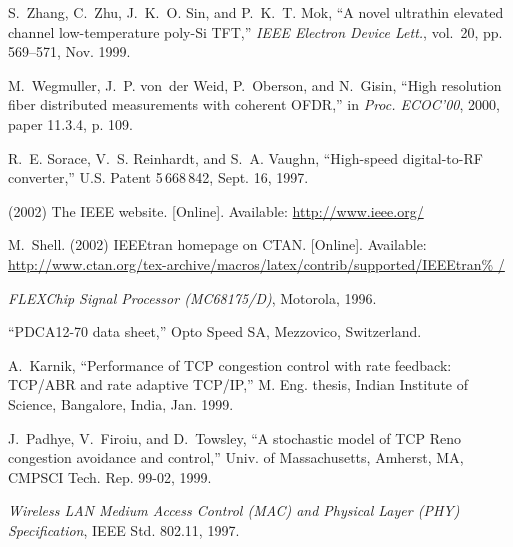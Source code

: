 \documentclass[conference]{worldcomp}
\begin{document}
\begin{thebibliography}{1}
S.~Zhang, C.~Zhu, J.~K.~O. Sin, and P.~K.~T. Mok, ``A novel ultrathin elevated
  channel low-temperature poly-{Si} {TFT},'' \emph{{IEEE} Electron Device
  Lett.}, vol.~20, pp. 569--571, Nov. 1999.

M.~Wegmuller, J.~P. von~der Weid, P.~Oberson, and N.~Gisin, ``High resolution
  fiber distributed measurements with coherent {OFDR},'' in \emph{Proc.
  {ECOC}'00}, 2000, paper 11.3.4, p. 109.

R.~E. Sorace, V.~S. Reinhardt, and S.~A. Vaughn, ``High-speed digital-to-{RF}
  converter,'' U.S. Patent 5\,668\,842, Sept. 16, 1997.

\BIBentryALTinterwordspacing
(2002) The {IEEE} website. [Online]. Available: \url{http://www.ieee.org/}
\BIBentrySTDinterwordspacing

\BIBentryALTinterwordspacing
M.~Shell. (2002) {IEEE}tran homepage on {CTAN}. [Online]. Available:
  \url{http://www.ctan.org/tex-archive/macros/latex/contrib/supported/IEEEtran%
/}
\BIBentrySTDinterwordspacing

\emph{{FLEXChip} Signal Processor ({MC68175/D})}, Motorola, 1996.

``{PDCA12-70} data sheet,'' Opto Speed SA, Mezzovico, Switzerland.

A.~Karnik, ``Performance of {TCP} congestion control with rate feedback:
  {TCP/ABR} and rate adaptive {TCP/IP},'' M. Eng. thesis, Indian Institute of
  Science, Bangalore, India, Jan. 1999.

J.~Padhye, V.~Firoiu, and D.~Towsley, ``A stochastic model of {TCP} {R}eno
  congestion avoidance and control,'' Univ. of Massachusetts, Amherst, MA,
  CMPSCI Tech. Rep. 99-02, 1999.

\emph{Wireless {LAN} Medium Access Control {(MAC)} and Physical Layer {(PHY)}
  Specification}, IEEE Std. 802.11, 1997.

\end{thebibliography}
\end{document}
